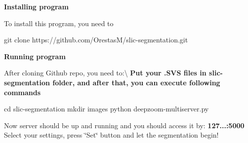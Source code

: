 {\bfseries {\bfseries Installing program}}

To install this program, you need to


\begin{DoxyCode}
git clone https://github.com/OrestasM/slic-segmentation.git
\end{DoxyCode}
 {\bfseries {\bfseries Running program}}

After cloning Github repo, you need to\+:\textbackslash{} {\bfseries Put your .S\+VS files in slic-\/segmentation folder, and after that, you can execute following commands} 
\begin{DoxyCode}
cd slic-segmentation
mkdir images
python deepzoom-multiserver.py
\end{DoxyCode}


Now server should be up and running and you should access it by\+: {\bfseries 127...\+:5000} Select your settings, press \char`\"{}\+Set\char`\"{} button and let the segmentation begin! 